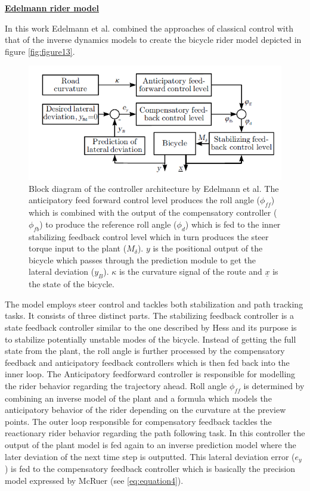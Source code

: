 \bigbreak
\underline{\textbf{Edelmann rider model\cite{edelmann2015}}}
\newline
\par
In this work Edelmann et al. combined the approaches of classical control with that of the inverse dynamics models to create the bicycle rider model depicted in figure \ref{fig:figure13}.
\begin{figure}[ht]
    \centering
    \includegraphics[scale=0.65]{images/edelmann_hybrid.png}
    \caption{Block diagram of the controller architecture by Edelmann et al. The anticipatory feed forward control level produces the roll angle (\ensuremath{\phi_{ff}}) which is combined with the output of the compensatory controller (\ensuremath{\phi_{fb}}) to produce the reference roll angle (\ensuremath{\phi_d}) which is fed to the inner stabilizing feedback control level which in turn produces the steer torque input to the plant (\ensuremath{M_\delta}). \ensuremath{y} is the positional output of the bicycle which passes through the prediction module to get the lateral deviation (\ensuremath{y_B}). \ensuremath{\kappa} is the curvature signal of the route and \ensuremath{\underline{x}} is the state of the bicycle.\cite{edelmann2015} }
    \label{fig:figure14}
\end{figure}
The model employs steer control and tackles both stabilization and path tracking tasks. It consists of three distinct parts. The stabilizing feedback controller is a state feedback controller similar to the one described by Hess \cite{hess2012modeling} and its purpose is to stabilize potentially unstable modes of the bicycle. Instead of getting the full state  from the plant, the roll angle is further processed by the compensatory feedback and anticipatory feedback controllers which is then fed back into the inner loop. The Anticipatory feedforward controller is responsible for modelling the rider behavior regarding the trajectory ahead. Roll angle \ensuremath{\phi_{ff}} is determined by combining an inverse model of the plant and a formula which models the anticipatory behavior of the rider depending on the curvature at the preview points. The outer loop responsible for compensatory feedback tackles the reactionary rider behavior regarding the path following task. In this controller the output  of the plant model is fed again to an inverse prediction model where the later deviation of the next time step  is outputted. This lateral deviation error (\ensuremath{e_y}) is fed to the compensatory feedback controller which is basically the precision model expressed by McRuer (see \ref{eq:equation4}).
